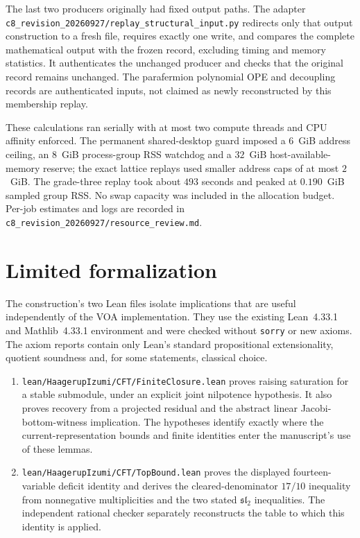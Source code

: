 \documentclass[11pt,a4paper]{article}
\theoremstyle{definition}
\newcommand{\artifact}[1]{\textnormal{\nolinkurl{#1}}}
\begin{document}
The last two producers originally had fixed output paths. The adapter
\artifact{c8_revision_20260927/replay_structural_input.py} redirects
only that output construction to a fresh file, requires exactly one
write, and compares the complete mathematical output with the frozen
record, excluding timing and memory statistics. It authenticates the
unchanged producer and checks that the original record remains unchanged.
The parafermion polynomial OPE and decoupling records are authenticated
inputs, not claimed as newly reconstructed by this membership replay.

These calculations ran serially with at most two compute threads and
CPU affinity enforced. The permanent shared-desktop guard imposed
a $6$~GiB address ceiling, an $8$~GiB process-group RSS watchdog and
a $32$~GiB host-available-memory reserve; the exact lattice replays
used smaller address caps of at most $2$~GiB. The grade-three replay
took about $493$ seconds and peaked at $0.190$~GiB sampled group RSS.
No swap capacity was included in the allocation budget. Per-job
estimates and logs are recorded in
\artifact{c8_revision_20260927/resource_review.md}.

\section{Limited formalization}\label{sec:formalization}
The construction's two Lean files isolate implications that are useful independently
of the VOA implementation. They use the existing Lean~4.33.1 and
Mathlib~4.33.1 environment and were checked without \texttt{sorry} or
new axioms. The axiom reports contain only Lean's standard
propositional extensionality, quotient soundness and, for some
statements, classical choice.

\begin{enumerate}
\item \artifact{lean/HaagerupIzumi/CFT/FiniteClosure.lean} proves
raising saturation for a stable submodule, under an explicit joint
nilpotence hypothesis. It also proves recovery from a projected
residual and the abstract linear Jacobi-bottom-witness implication.
The hypotheses identify exactly where the current-representation
bounds and finite identities enter the manuscript's use of these
lemmas.
\item \artifact{lean/HaagerupIzumi/CFT/TopBound.lean} proves the
displayed fourteen-variable deficit identity and derives the
cleared-denominator $17/10$ inequality from nonnegative
multiplicities and the two stated $\mathfrak{sl}_2$ inequalities.
The independent rational checker separately reconstructs the
table to which this identity is applied.
\end{enumerate}
\end{document}
